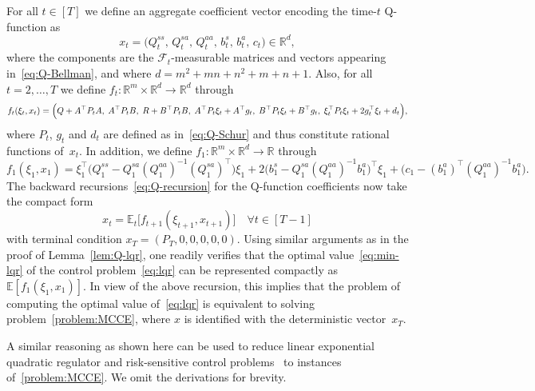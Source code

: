 \documentclass[11pt]{article}
\begin{document}
For all $t\in[T]$ we define an aggregate coefficient vector encoding the time-$t$ Q-function as
\[
	x_t = \bigl(Q_t^{ss},\,Q_t^{sa},\,Q_t^{aa},\,b_t^s,\,b_t^a,\,c_t\bigr) \in\mathbb R^{d},
\]
where the components are the $\mathcal F_t$-measurable matrices and vectors appearing in~\eqref{eq:Q-Bellman}, and where $d=m^2+mn+n^2+m+n+1$. Also, for all $t=2,\ldots,T$ we define $f_t:\mathbb{R}^{m}\times\mathbb R^d \to\mathbb R^d$ through
\[
	f_t(\xi_t,x_t) = \Bigl( Q + A^\top P_t A,\; A^\top P_t B,\; R + B^\top P_t B,\; A^\top P_t \xi_t + A^\top g_t,\; B^\top P_t \xi_t + B^\top g_t,\; \xi_t^\top P_t \xi_t + 2g_t^\top\xi_t + d_t \Bigr),
\]
where $P_t$, $g_t$ and $d_t$ are defined as in~\eqref{eq:Q-Schur} and thus constitute rational functions of~$x_t$. In addition, we define $f_1:\mathbb R^m\times\mathbb R^d\to\mathbb R$ through
\[
	f_1(\xi_1,x_1) = \xi_1^\top \Big(Q_1^{ss}-Q_1^{sa}(Q_1^{aa})^{-1}(Q_1^{sa})^\top\Big) \xi_1 +2\Big(b_1^s - Q_1^{sa}(Q_1^{aa})^{-1}b_1^a\Big)^\top \xi_1 + \Big(c_1 - (b_1^a)^\top (Q_1^{aa})^{-1} b_1^a\Big).
\]
The backward recursions~\eqref{eq:Q-recursion} for the Q-function coefficients now take the compact form
\[
	x_{t} = \mathbb{E}_{t}\!\bigl[f_{t+1}(\xi_{t+1},x_{t+1})\bigr] \quad \forall t\in[T-1]
\]
with terminal condition $x_T=(P_T,0,0,0,0,0)$. Using similar arguments as in the proof of Lemma~\ref{lem:Q-lqr}, one readily verifies that the optimal value~\eqref{eq:min-lqr} of the control problem~\eqref{eq:lqr} can be represented compactly as $\mathbb E[f_1(\xi_1,x_1)]$. In view of the above recursion, this implies that the problem of computing the optimal value of~\eqref{eq:lqr} is equivalent to solving problem~\eqref{problem:MCCE}, where $x$ is identified with the deterministic vector~$x_T$. 

A similar reasoning as shown here can be used to reduce linear exponential quadratic regulator and risk-sensitive control problems~\cite{whittle1990risk} to instances of~\eqref{problem:MCCE}. We omit the derivations for brevity.
\end{document}
